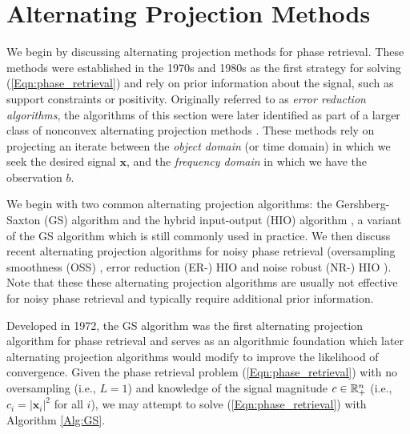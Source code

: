 \section{Alternating Projection Methods}		\label{Subsubsec:phase_retrieval-alternating_direction_methods}



We begin by discussing alternating projection methods for phase retrieval.  
These methods were established in the 1970s and 1980s as the first strategy for solving (\ref{Eqn:phase_retrieval}) and rely on prior information about the signal, such as support constraints or positivity.  
Originally referred to as \textit{error reduction algorithms}, the algorithms of this section were later identified as part of a larger class of nonconvex alternating projection methods \cite{LeviS84}.  
These methods rely on projecting an iterate between the \textit{object domain} (or time domain) in which we seek the desired signal $\mathbf{x}$, and the \textit{frequency domain} in which we have the observation $b$.  

We begin with two common alternating projection algorithms: the Gershberg-Saxton (GS) algorithm \cite{GS72} and the hybrid input-output (HIO) algorithm \cite{Fienup82}, a variant of the GS algorithm which is still commonly used in practice.  
We then discuss recent alternating projection algorithms for noisy phase retrieval (oversampling smoothness (OSS) \cite{rodriguez2013oversampling}, error reduction (ER-) HIO and noise robust (NR-) HIO \cite{martin2012noise}).
Note that these these alternating projection algorithms are usually not effective for noisy phase retrieval and typically require additional prior information.





Developed in 1972, the GS algorithm was the first alternating projection algorithm for phase retrieval and serves as an algorithmic foundation which later alternating projection algorithms would modify to improve the likelihood of convergence.  
Given the phase retrieval problem (\ref{Eqn:phase_retrieval}) with no oversampling (i.e., $L=1$) and knowledge of the signal magnitude $c \in {\mathbb R}^n_+$ (i.e., $c_i = |\mathbf{x}_i|^2$ for all $i$), we may attempt to solve (\ref{Eqn:phase_retrieval}) with Algorithm \ref{Alg:GS}.

